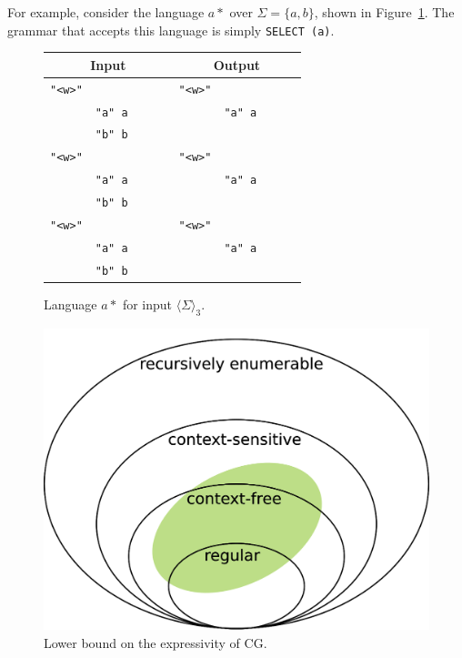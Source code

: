 \documentclass[11pt]{article}
\def\t#1{\texttt{#1}}
\def\maxAmb#1{$\langle \Sigma \rangle_#1$}
\begin{document}
For example, consider the language $a*$ over $\Sigma = \{a,b\}$,
shown in Figure~\ref{fig:astar}.
The grammar that accepts this language is simply \texttt{SELECT (a)}.

\def\wwf{\t{"<w>"}}
\def\swf{\t{"<s>"}}
\def\alm{\t{"a" a}~~~~~~}
\def\blm{\t{"b" b}~~~~~~}

\begin{figure}[h]
\centering

\begin{tabular}{cl |  rl}
\multicolumn{2}{c|}{\textbf{Input}} & \multicolumn{2}{c}{\textbf{Output}} \\ \hline

\wwf  &        &  \wwf &        \\
         & \alm  &          & \alm  \\
         & \blm  &          &        \\
\wwf  &        &  \wwf &        \\
         & \alm  &          & \alm  \\
         & \blm  &          &        \\
\wwf  &        &  \wwf &        \\
         & \alm  &          & \alm  \\
         & \blm  &          &        \\
\end{tabular}

\caption{Language $a*$ for input \maxAmb{3}.}
\label{fig:astar}
\end{figure}




\begin{figure}[h]
  \centering
  \includegraphics[width=0.8\linewidth]{chomsky}
  \caption{Lower bound on the expressivity of CG.}
  \label{fig:nocorr}
\end{figure}
\end{document}
